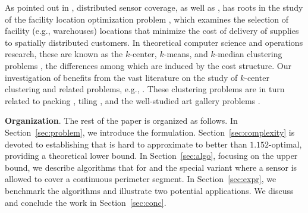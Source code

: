 As pointed out in \cite{cortes2004coverage,schwager2009decentralized}, 
distributed sensor coverage, as well as \osgt, has roots in the study 
of the facility location optimization problem 
\cite{weber1929theory,drezner1995facility}, which examines the selection 
of facility (e.g., warehouses) locations that minimize the cost of delivery 
of supplies to spatially distributed customers. In theoretical computer 
science and operations research, these are known as the $k$-center, 
$k$-means, and $k$-median clustering problems \cite{har2011geometric}, 
the differences among which are induced by the cost structure. Our 
investigation of \osgt benefits from the vast literature on 
the study of $k$-center clustering and related problems, e.g., 
\cite{feder1988optimal,hochbaum1985best,gonzalez1985clustering,daskin2000new,shamos1975closest}.
%
These clustering problems are in turn related to packing 
\cite{hales2005proof}, tiling \cite{thue1910dichteste}, and the 
well-studied art gallery problems \cite{o1987art,shermer1992recent}.

\textbf{Organization}. The rest of the paper is organized as follows. 
In Section~\ref{sec:problem}, we introduce the \osgt formulation. 
Section~\ref{sec:complexity} is devoted to establishing that \osgt is 
hard to approximate to better than $1.152$-optimal, providing a theoretical
lower bound. In Section~\ref{sec:algo}, focusing on the upper bound, 
we describe algorithms that for \osgt and the special \opgt variant 
where a sensor is allowed to cover a continuous perimeter segment.
In Section~\ref{sec:expr}, we benchmark the algorithms and illustrate two 
potential applications. We discuss and conclude the work in Section~\ref{sec:conc}.



